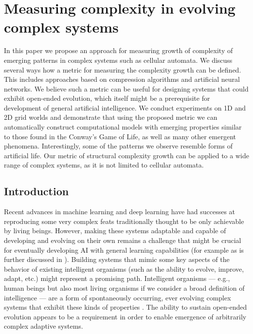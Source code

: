 \chapter{Measuring complexity in evolving complex systems}
\label{cha:meas-compl-evolv}

  In this paper we propose an approach for measuring growth of complexity of
  emerging patterns in complex systems such as cellular automata. We discuss
  several ways how a metric for measuring the complexity growth can be defined.
  This includes approaches based on compression algorithms and artificial neural
  networks. We believe such a metric can be useful for designing systems that
  could exhibit open-ended evolution, which itself might be a prerequisite for
  development of general artificial intelligence. We conduct experiments on 1D
  and 2D grid worlds and demonstrate that using the proposed metric we can
  automatically construct computational models with emerging properties similar
  to those found in the Conway's Game of Life, as well as many other emergent
  phenomena. Interestingly, some of the patterns we observe resemble forms of
  artificial life. Our metric of structural complexity growth can be applied to
  a wide range of complex systems, as it is not limited to cellular automata.

\section{Introduction}
Recent advances in machine learning and deep learning have had successes at
reproducing some very complex feats traditionally thought to be only achievable
by living beings. However, making these systems adaptable and capable of
developing and evolving on their own remains a challenge that might be crucial
for eventually developing AI with general learning capabilities (for example as
is further discussed in \parencite{mikolovRoadmapMachineIntelligence2018}).
Building systems that mimic some key aspects of the behavior of existing
intelligent organisms (such as the ability to evolve, improve, adapt, etc.)
might represent a promising path. Intelligent organisms --- e.g., human beings but
also most living organisms if we consider a broad definition of intelligence ---
are a form of spontaneously occurring, ever evolving complex systems that
exhibit these kinds of properties
\parencite{bookerPerspectivesAdaptationNatural2004}. The ability to sustain
open-ended evolution appears to be a requirement in order to enable emergence of
arbitrarily complex adaptive systems.

